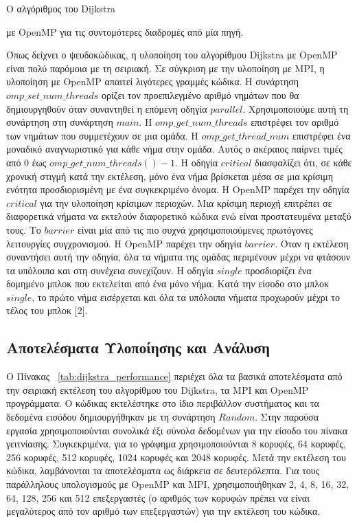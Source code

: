 \documentclass[12pt,a4paper]{article} %
\begin{document}
{{\raggedright{} Ο αλγόριθμος του Dijkstra} με OpenMP για τις συντομότερες διαδρομές από μία πηγή.\label{alg:dijkstra3}\par
\vspace{0.3cm}

Όπως δείχνει ο ψευδοκώδικας, η υλοποίηση του αλγορίθμου  Dijkstra με OpenMP είναι πολύ παρόμοια με τη σειριακή. 
Σε σύγκριση με την υλοποίηση με MPI, η υλοποίηση με OpenMP απαιτεί λιγότερες γραμμές κώδικα.
Η συνάρτηση \texttt{$omp\_set\_num\_threads$} ορίζει τον προεπιλεγμένο αριθμό νημάτων που θα δημιουργηθούν όταν συναντηθεί η επόμενη οδηγία \texttt{$parallel$}. Χρησιμοποιούμε αυτή τη συνάρτηση στη συνάρτηση \texttt{$main$}.
Η \texttt{$omp\_get\_num\_threads$} επιστρέφει τον αριθμό των νημάτων που συμμετέχουν σε μια ομάδα. Η \texttt{$omp\_get\_thread\_num$} επιστρέφει ένα μοναδικό αναγνωριστικό για κάθε νήμα στην ομάδα. Αυτός ο ακέραιος παίρνει τιμές από $0$ έως \texttt{$omp\_get\_num\_threads()-1$}.
Η οδηγία \texttt{$critical$} διασφαλίζει ότι, σε κάθε χρονική στιγμή κατά την εκτέλεση, μόνο ένα νήμα βρίσκεται μέσα σε μια κρίσιμη ενότητα προσδιορισμένη με ένα συγκεκριμένο όνομα.
Η OpenMP παρέχει την οδηγία \texttt{$critical$} για την υλοποίηση κρίσιμων περιοχών. Μια κρίσιμη περιοχή επιτρέπει σε διαφορετικά νήματα να εκτελούν διαφορετικό κώδικα ενώ είναι προστατευμένα μεταξύ τους.
Το \texttt{$barrier$} είναι μία από τις πιο συχνά χρησιμοποιούμενες πρωτόγονες λειτουργίες συγχρονισμού. Η OpenMP παρέχει την οδηγία \texttt{$barrier$}. Όταν η εκτέλεση συναντήσει αυτή την οδηγία, όλα τα νήματα της ομάδας περιμένουν μέχρι να φτάσουν τα υπόλοιπα και στη συνέχεια συνεχίζουν.
Η οδηγία \texttt{$single$} προσδιορίζει ένα δομημένο μπλοκ που εκτελείται από ένα μόνο νήμα. Κατά την είσοδο στο μπλοκ \texttt{$single$}, το πρώτο νήμα εισέρχεται και όλα τα υπόλοιπα νήματα προχωρούν μέχρι το τέλος του μπλοκ [2].
\vspace{0.5cm}

\subsection{Αποτελέσματα Υλοποίησης και Ανάλυση}

Ο Πίνακας ~\ref{tab:dijkstra_performance} περιέχει όλα τα βασικά αποτελέσματα από την σειριακή εκτέλεση του αλγορίθμου του Dijkstra, τα MPI και OpenMP προγράμματα. Ο κώδικας εκτελέστηκε στο ίδιο περιβάλλον συστήματος και τα δεδομένα εισόδου δημιουργήθηκαν με τη συνάρτηση \texttt{$Random$}. Στην παρούσα εργασία χρησιμοποιούνται συνολικά έξι σύνολα δεδομένων για την είσοδο του πίνακα γειτνίασης. Συγκεκριμένα, για το γράφημα χρησιμοποιούνται 8 κορυφές, 64 κορυφές, 256 κορυφές, 512 κορυφές, 1024 κορυφές και 2048 κορυφές. Μετά την εκτέλεση του κώδικα, λαμβάνονται τα αποτελέσματα ως διάρκεια σε δευτερόλεπτα. Για τους παράλληλους υπολογισμούς με OpenMP και MPI, χρησιμοποιήθηκαν 2, 4, 8, 16, 32, 64, 128, 256 και 512 επεξεργαστές (ο αριθμός των κορυφών πρέπει να είναι μεγαλύτερος από τον αριθμό των επεξεργαστών) για την εκτέλεση του κώδικα.
\vspace{0.3cm}

}
\end{document}
